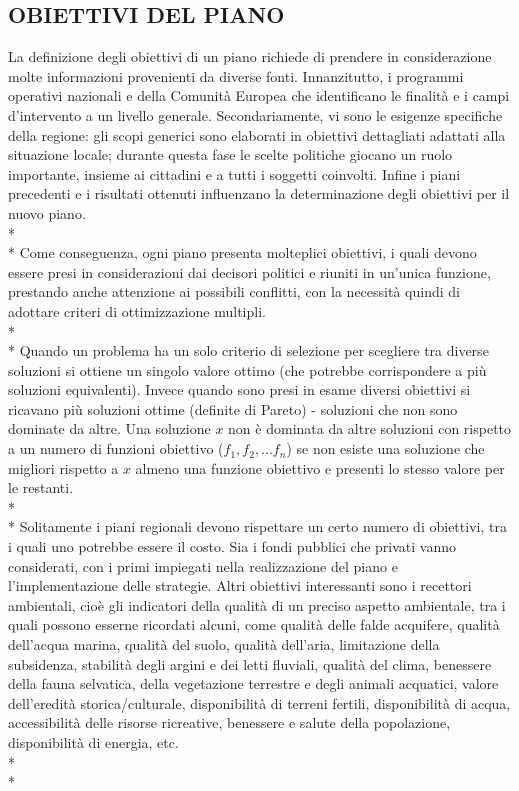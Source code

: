 \documentclass[12pt,a4paper,openright,twoside]{report}
\begin{document}
\subsection[OBIETTIVI]{\nohyphens{OBIETTIVI DEL PIANO}}
La definizione degli obiettivi di un piano richiede di prendere  in considerazione molte informazioni provenienti da diverse fonti. Innanzitutto, i programmi operativi nazionali e della Comunità Europea che identificano le finalità e i campi d'intervento a un livello generale. Secondariamente, vi sono le esigenze specifiche della regione: gli scopi generici sono elaborati in obiettivi dettagliati adattati alla situazione locale; durante questa fase le scelte politiche giocano un ruolo importante, insieme ai cittadini e a tutti i soggetti coinvolti. Infine i piani precedenti e i risultati ottenuti influenzano la determinazione degli obiettivi per il nuovo piano.\\*\\*
Come conseguenza, ogni piano presenta molteplici obiettivi, i quali devono essere presi in considerazioni dai decisori politici e riuniti in un'unica funzione, prestando anche attenzione ai possibili conflitti, con la necessità quindi di adottare criteri di ottimizzazione multipli.\\*\\*
Quando un problema ha un solo criterio di selezione per scegliere tra diverse soluzioni si ottiene un singolo valore ottimo (che potrebbe corrispondere a più soluzioni equivalenti). Invece quando sono presi in esame diversi obiettivi si ricavano più soluzioni ottime (definite di Pareto) - soluzioni che non sono dominate da altre. Una soluzione $x$ non è dominata da altre soluzioni con rispetto a un numero di funzioni obiettivo ($f_1, f_2, ...f_n$) se non esiste una soluzione che migliori rispetto a $x$ almeno una funzione obiettivo e presenti lo stesso valore per le restanti.\\*\\*
Solitamente i piani regionali devono rispettare un certo numero di obiettivi, tra i quali uno potrebbe essere il costo. Sia i fondi pubblici che privati vanno considerati, con i primi impiegati nella realizzazione del piano e l'implementazione delle strategie. Altri obiettivi interessanti sono i recettori ambientali, cioè gli indicatori della qualità di un preciso aspetto ambientale, tra i quali possono esserne ricordati alcuni, come qualità delle falde acquifere, qualità dell'acqua marina, qualità del suolo, qualità dell'aria, limitazione della subsidenza, stabilità degli argini e dei letti fluviali, qualità del clima, benessere della fauna selvatica, della vegetazione terrestre e degli animali acquatici, valore dell'eredità storica/culturale, disponibilità di terreni fertili, disponibilità di acqua, accessibilità delle risorse ricreative, benessere e salute della popolazione, disponibilità di energia, etc.\\*\\*
\end{document}
